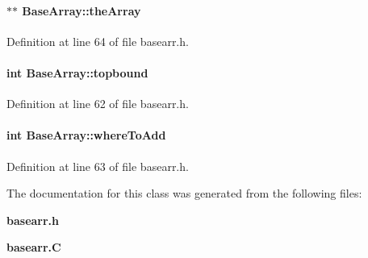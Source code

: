 \paragraph{ $\ast$$\ast$ Base\-Array::the\-Array\hspace{0.3cm}{\tt  [protected]}}\hfill



Definition at line 64 of file basearr.h.\label{BaseArray_n2}
\paragraph{\setlength{\rightskip}{0pt plus 5cm}int Base\-Array::topbound\hspace{0.3cm}{\tt  [protected]}}\hfill



Definition at line 62 of file basearr.h.\label{BaseArray_n3}
\paragraph{\setlength{\rightskip}{0pt plus 5cm}int Base\-Array::where\-To\-Add\hspace{0.3cm}{\tt  [protected]}}\hfill



Definition at line 63 of file basearr.h.

The documentation for this class was generated from the following files:\begin{CompactItemize}
\item 
{\bf basearr.h}\item 
{\bf basearr.C}\end{CompactItemize}
